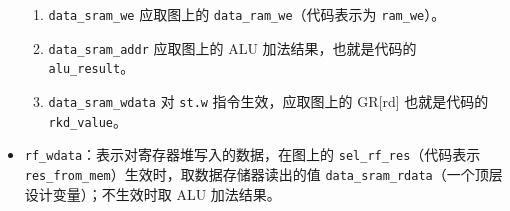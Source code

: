 \documentclass[UTF8]{ctexart}
\begin{document}
\begin{itemize}[itemsep=2pt, parsep=3pt]
        \begin{enumerate}
            \item \verb!data_sram_we! 应取图上的 \verb!data_ram_we!（代码表示为 \verb!ram_we!）。
            \item \verb!data_sram_addr! 应取图上的 ALU 加法结果，也就是代码的 \verb!alu_result!。
            \item \verb!data_sram_wdata! 对 \verb!st.w! 指令生效，应取图上的 GR[rd] 也就是代码的 \verb!rkd_value!。
        \end{enumerate}
    \item \verb!rf_wdata!：表示对寄存器堆写入的数据，在图上的 \verb!sel_rf_res!（代码表示 \verb!res_from_mem!）生效时，取数据存储器读出的值 \verb!data_sram_rdata!（一个顶层设计变量）；不生效时取 ALU 加法结果。
\end{itemize}

\BgThispage
\end{document}
